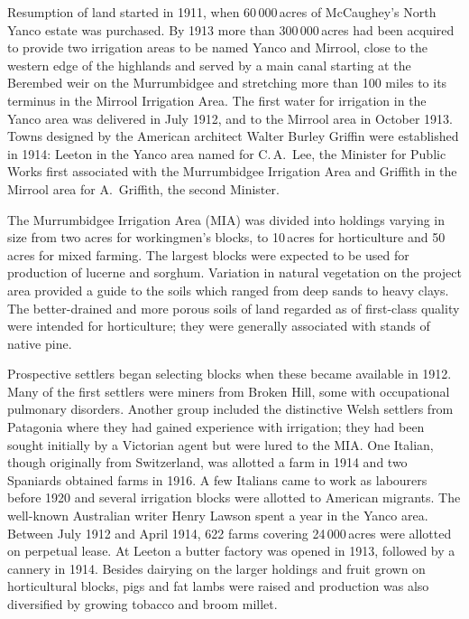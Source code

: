 Resumption of land started in 1911, when 60\,000\,acres of
McCaugh\-ey's North Yanco estate was purchased.  By 1913 more than
300\,000\,acres had been acquired to provide two irrigation areas to
be named Yanco and Mirrool,  
close to the western edge of the highlands and served by a main canal
starting at the Berembed weir  on the
Murrumbidgee and stretching more than 100 miles to its terminus in the
Mirrool Irrigation Area.  The first
water for irrigation in the Yanco area was delivered in July 1912, and
to the Mirrool area in October 1913.  Towns designed by the American
architect Walter Burley Griffin
 were established in 1914: Leeton
 in the Yanco area named for C.\,A.~Lee,  the Minister for Public Works first associated with the
Murrumbidgee Irrigation Area and Griffith  in the
Mirrool area for A.~Griffith, the second
Minister.

The Murrumbidgee Irrigation Area (MIA)
 was divided into holdings varying
in size from two acres for workingmen's blocks, to 10\,acres for
horticulture and 50\,acres for mixed farming.  The largest blocks were
expected to be used for production of lucerne and sorghum.  Variation
in natural vegetation on the project area provided a guide to the
soils which ranged from deep sands to heavy clays.  The better-drained
and more porous soils of land regarded as of first-class quality were
intended for horticulture; they were generally associated with stands
of native pine.

Prospective settlers began selecting blocks when these became
available in 1912.  Many of the first settlers were miners from Broken
Hill, some with occupational pulmonary disorders.  Another group
included the distinctive Welsh settlers from Patagonia where they had
gained experience with irrigation; they had been sought initially by a
Victorian agent but were lured to the MIA.  One Italian, though
originally from Switzerland, was allotted a farm in 1914 and two
Spaniards obtained farms in 1916.  A few Italians came to work as
labourers before 1920 and several irrigation blocks were allotted to
American migrants.  The well-known Australian writer Henry Lawson
spent a year in the Yanco area.  Between July 1912 and April 1914, 622
farms covering 24\,000\,acres were allotted on perpetual lease.  At
Leeton a butter factory was opened in 1913, followed by a cannery in
1914.  Besides dairying on the larger holdings and fruit grown on
horticultural blocks, pigs and fat lambs were raised and production
was also diversified by growing tobacco and broom
millet.

